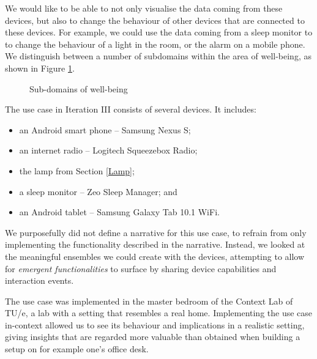 We would like to be able to not only visualise the data coming from these devices, but also to change the behaviour of other devices that are connected to these devices. For example, we could use the data coming from a sleep monitor to to change the behaviour of a light in the room, or the alarm on a mobile phone. We distinguish between a number of subdomains within the area of well-being, as shown in Figure \ref{Wellbeing}.

\begin{figure}[bth]
\begin{center}
	\caption{Sub-domains of well-being}
	\label{Wellbeing}        
\end{center}
\end{figure}

The use case in Iteration III consists of several devices. It includes:

\begin{itemize}
	\item an Android smart phone -- Samsung Nexus S;
	\item an internet radio -- Logitech Squeezebox Radio;
	\item the lamp from Section \ref{Lamp};
	\item a sleep monitor -- Zeo Sleep Manager; and 
	\item an Android tablet -- Samsung Galaxy Tab 10.1 WiFi.
\end{itemize}

We purposefully did not define a narrative for this use case, to refrain from only implementing the functionality described in the narrative. Instead, we looked at the meaningful ensembles we could create with the devices, attempting to allow for \emph{emergent functionalities} to surface by sharing device capabilities and interaction events.

The use case was implemented in the master bedroom of the Context Lab of TU/e, a lab with a setting that resembles a real home. Implementing the use case in-context allowed us to see its behaviour and implications in a realistic setting, giving insights that are regarded more valuable than obtained when building a setup on for example one's office desk. 


